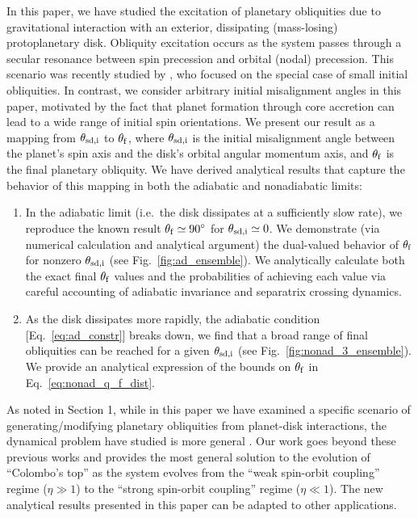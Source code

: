 \documentclass[twocolumn,twocolappendix]{aastex63}
\begin{document}
In this paper, we have studied the excitation of planetary obliquities due to
gravitational interaction with an exterior, dissipating (mass-losing)
protoplanetary disk. Obliquity excitation occurs as the system passes through a
secular resonance between spin precession and orbital (nodal) precession. This
scenario was recently studied by \citet{millholland_disk}, who focused on the
special case of small initial obliquities.  In contrast, we consider arbitrary
initial misalignment angles in this paper, motivated by the fact that planet
formation through core accretion can lead to a wide range of initial spin
orientations.  We present our result as a mapping from $\theta_{\rm sd, i}$ to
$\theta_{\rm f}$, where $\theta_{\rm sd, i}$ is the initial misalignment angle
between the planet's spin axis and the disk's orbital angular momentum axis, and
$\theta_{\rm f}$ is the final planetary obliquity. We have derived analytical
results that capture the behavior of this mapping in both the adiabatic and
nonadiabatic limits:
\begin{enumerate}
    \item In the adiabatic limit (i.e.\ the disk dissipates at a
        sufficiently slow rate), we reproduce the known result $\theta_{\rm f}
        \simeq 90^\circ$ for $\theta_{\rm sd, i} \simeq 0$. We demonstrate (via
        numerical calculation and analytical argument) the dual-valued behavior
        of $\theta_{\rm f}$ for nonzero $\theta_{\rm sd, i}$ (see
        Fig.~\ref{fig:ad_ensemble}). We analytically calculate both the exact
        final $\theta_{\rm f}$ values and the probabilities of achieving each
        value via careful accounting of adiabatic invariance and separatrix
        crossing dynamics.
    \item As the disk dissipates more rapidly, the adiabatic condition
        [Eq.~\eqref{eq:ad_constr}] breaks down, we find that a broad range of
        final obliquities can be reached for a given $\theta_{\rm sd, i}$ (see
        Fig.~\ref{fig:nonad_3_ensemble}). We provide an analytical expression of
        the bounds on $\theta_{\rm f}$ in Eq.~\eqref{eq:nonad_q_f_dist}.
\end{enumerate}

As noted in Section 1, while in this paper we have examined a specific scenario
of generating/modifying planetary obliquities from planet-disk interactions, the
dynamical problem have studied is more general
\citep{colombo1966,peale1969,peale1974possible,ward1975tidal,henrard1987}. Our
work goes beyond these previous works and provides the most general solution to
the evolution of ``Colombo's top'' as the system evolves from the ``weak
spin-orbit coupling'' regime ($\eta\gg 1$) to the ``strong spin-orbit coupling''
regime ($\eta\ll 1$).  The new analytical results presented in this paper can be
adapted to other applications.
\end{document}
